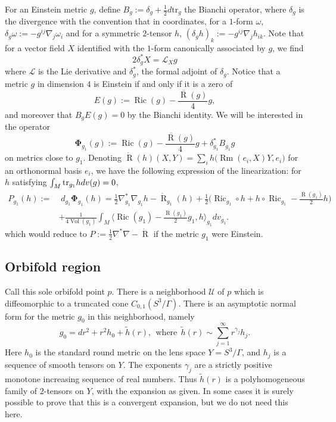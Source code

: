 \documentclass[12pt]{article}
\DeclareMathOperator{\Rm}{\operatorname{Rm}}
\DeclareMathOperator{\R}{\operatorname{R}}
\DeclareMathOperator{\vol}{\operatorname{Vol}}
\DeclareMathOperator{\Ric}{\operatorname{Ric}}
\newcommand{\calU}{{\mathcal U}}
\begin{document}
For an Einstein metric $g$, define $B_{g}:= \delta_g+\frac{1}{2} d\mathrm{tr}_g$ the Bianchi operator, where $\delta_g$ is the divergence with the convention that in coordinates, for a $1$-form $\omega$, $\delta_g\omega := -g^{ij}\nabla_j\omega_{i}$ and for a symmetric $2$-tensor $h$, $(\delta_gh)_k := -g^{ij}\nabla_jh_{ik}$. Note that for a vector field $X$ identified with the $1$-form canonically associated by $g$, we find $$2\delta^*_g X = \mathcal{L}_Xg$$ where $\mathcal{L}$ is the Lie derivative and $\delta^*_g$, the formal adjoint of $\delta_g$. 
Notice that a metric $g$ in dimension $4$ is Einstein if and only if it is a zero of $$E(g):= \Ric(g)-\frac{\overline{\R}(g)}{4}g,$$
    and moreover that $B_gE(g)= 0$ by the Bianchi identity. We will be interested in the operator
    $$\mathbf{\Phi}_{g_1}(g):= \Ric(g)-\frac{\overline{\R}(g)}{4}g + \delta_{g_1}^*B_{g_1}g$$
    on metrics close to $g_1$. Denoting $\mathring{\R}(h)(X,Y)= \sum_i h\big(\Rm(e_i,X)Y,e_i\big)$ for an orthonormal basis $e_i$, we have the following expression of the linearization: for $h$ satisfying $\int_M\textup{tr}_{g_1}h dv(g)=0$,
    \begin{align}
    P_{{g_1}}(h):=& \;d_{g_1}\mathbf{\Phi}_{g_1}(h) = \frac{1}{2}\nabla^*_{g_1}\nabla_{g_1} h  -\mathring{\R}_{g_1}(h)+\frac{1}{2}\Big(\Ric_{g_1}\circ h+h\circ \Ric_{g_1} - \frac{\overline{\R}({g_1})}{2}h\Big)\nonumber\\
    &+ \frac{1}{4\vol({g_1})}\int_M\Big\langle\Ric({g_1})-\frac{\R({g_1})}{2}g_1, h\Big\rangle_{g_1} dv_{g_1}.\label{bar P g}
    \end{align}
    which would reduce to $ P:=  \frac{1}{2}\nabla^*\nabla  -\mathring{\R} $ if the metric $g_1$ were Einstein.


\subsection{Orbifold region}

Call this sole orbifold point $p$. There is a neighborhood $\calU$ of $p$ which is diffeomorphic to
a truncated cone $C_{0,1}(S^3/\Gamma)$.  There is an asymptotic normal form for the metric $g_0$ 
in this neighborhood, namely
\begin{equation}
g_0 = dr^2 + r^2 h_0 + \tilde{h}(r), \ \ \mbox{where}\ \ \tilde{h}(r) \sim \sum_{j=1}^\infty r^{\gamma_j} h_j.
\label{g0}
\end{equation}
Here $h_0$ is the standard round metric on the lens space $Y = S^3/\Gamma$, and $h_j$ is a sequence of
smooth tensors on $Y$. The exponents $\gamma_j$ are a strictly positive monotone increasing sequence of
real numbers. Thus $\tilde{h}(r)$ is a polyhomogeneous family of $2$-tensors on $Y$, with the expansion as given. 
In some cases it is surely possible to prove that this is a convergent expansion, but we do not need this here.
\end{document}
